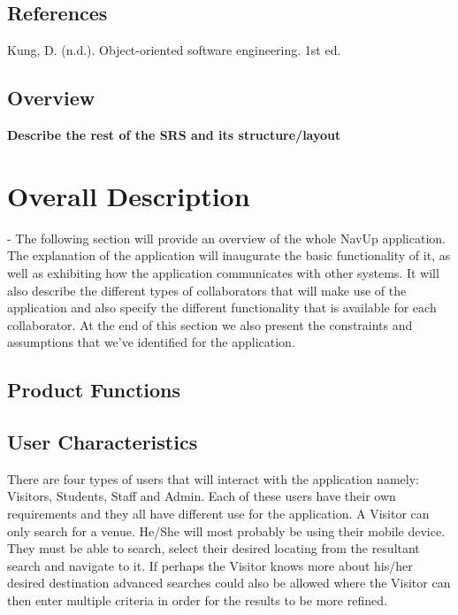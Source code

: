 \documentclass[12pt]{article}
\begin{document}
		
	\subsection{References}
		Kung, D. (n.d.). Object-oriented software engineering. 1st ed.
		
	\subsection{Overview}
		{\bfseries Describe the rest of the SRS and its structure/layout}
	\section{Overall Description}	
	- The following section will provide an overview of the whole NavUp application. The explanation of the application will inaugurate the basic functionality of it, as well as exhibiting how the application communicates with other systems. It will also describe the different types of collaborators that will make use of the application and also specify the different functionality that is available for each collaborator. At the end of this section we also present the constraints and assumptions that we've identified for the application. 
	\subsection{Product Functions}
	
	\subsection{User Characteristics}
	There are four types of users that will interact with the application namely: Visitors, Students, Staff and Admin. Each of these users have their own requirements and they all have different use for the application. A Visitor can only search for a venue. He/She will most probably be using their mobile device. They must be able to search, select their desired locating from the resultant search and navigate to it. If perhaps the Visitor knows more about his/her desired destination advanced searches could also be allowed where the Visitor can then enter multiple criteria in order for the results to be more refined.
	
\end{document}
